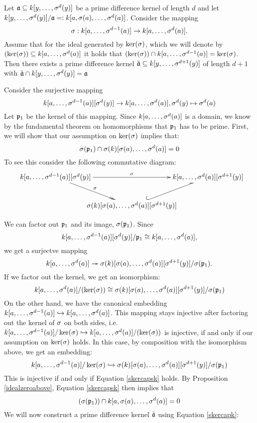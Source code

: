 
 
\begin{prop}
Let $\mathfrak{a} \subseteq k[y,\ldots,\sigma^d(y)]$ be a prime difference kernel of length $d$ and let $k[y,\ldots,\sigma^d(y)]/\mathfrak{a} =: k[a,\sigma(a),\ldots,\sigma^d(a)]$. Consider the mapping 
\[ \sigma: k[a,\ldots,\sigma^{d-1}(a)] \rightarrow k[a,\ldots,\sigma^d(a)]. \]
Assume that for the ideal generated by $\operatorname{ker}(\sigma)$, which we will denote by $(\operatorname{ker}(\sigma)) \subseteq k[a,\ldots,\sigma^d(a)]$ it holds that $(\operatorname{ker}(\sigma)) \cap k[a,\ldots,\sigma^{d-1}(a)] = \operatorname{ker}(\sigma)$. 
Then there exists a prime difference kernel $\tilde {\mathfrak{a}} \subseteq k[y,\ldots,\sigma^{d+1}(y)]$ of length $d+1$ with $\tilde {\mathfrak{a}} \cap k[y,\ldots,\sigma^d(y)] = \mathfrak{a}$
\begin{bew}
Consider the surjective mapping 
\[ k[a,\ldots,\sigma^{d-1}(a)][\sigma^d(y)] \rightarrow k[a,\ldots,\sigma^d(a)], \sigma^d(y) \mapsto \sigma^d(a) \]
Let $\mathfrak{p}_1$ be the kernel of this mapping. Since $k[a,\ldots,\sigma^d(a)]$ is a domain, we know by the fundamental theorem on homomorphisms that $\mathfrak{p}_1$ has to be prime. 
First, we will show that our assumption on $\operatorname{ker}(\sigma)$ implies that:
\begin{equation}\label{skercapsk} \sigma(\mathfrak{p}_1) \cap \sigma(k)[\sigma(a),\ldots,\sigma^d(a)] = 0 \end{equation}
To see this consider the following commutative diagram:
\[
\begin{xy}
\xymatrixcolsep{-1pc}
 \xymatrix{
      k[a,\ldots,\s^{d-1}(a)][\s^d(y)] \ar[rr]^\s \ar@{->>}[rd]^\s  &     &  k[a,\ldots,\s^d(a)][\s^{d+1}(y)]   \\
      &  \s(k)[\s(a),\ldots,\s^d(a)][\s^{d+1}(y)] \ar@^{(->}[ur] &  }
\end{xy}
\]

We can factor out $\mathfrak{p}_1$ and its image, $\sigma(\mathfrak{p}_1)$. Since $$k[a,\ldots,\sigma^{d-1}(a)][\sigma^d(y)] / \mathfrak{p}_1 \cong k[a,\ldots, \sigma^d(a)],$$
we get a surjectve mapping $$k[a,\ldots, \sigma^d(a)] \twoheadrightarrow \sigma(k)[\sigma(a),\ldots,\sigma^d(a)][\sigma^{d+1}(y)]/\sigma(\mathfrak{p}_1).$$
If we factor out the kernel, we get an isomorphism:
\[ k[a,\ldots, \sigma^d(a)]/(\operatorname{ker}(\sigma)) \cong \sigma(k)[\sigma(a),\ldots,\sigma^d(a)][\sigma^{d+1}(y)]/\sigma(\mathfrak{p}_1)\]
On the other hand, we have the canonical embedding $k[a,\ldots,\sigma^{d-1}(a)] \hookrightarrow k[a,\ldots,\sigma^{d}(a)]$.
This mapping stays injective after factoring out the kernel of $\sigma$ on both sides, 
i.e. $k[a,\ldots,\sigma^{d-1}(a)]/\operatorname{ker}(\sigma) \hookrightarrow k[a,\ldots,\sigma^{d}(a)]/(\operatorname{ker}(\sigma))$ is injective, if and only if our assumption on $\ker(\sigma)$ holds.
In this case, by composition with the isomorphism above, we get an embedding:
\[ k[a,\ldots,\sigma^{d-1}(a)]/\operatorname{ker}(\sigma) \hookrightarrow \sigma(k)[\sigma(a),\ldots,\sigma^d(a)][\sigma^{d+1}(y)]/\sigma(\mathfrak{p}_1) \]
This is injective if and only if Equation \ref{skercapsk} holds.
By Proposition \ref{idealzeroabove}, Equation \ref{skercapsk} then implies that
\begin{equation}\label{skercapk}
(\sigma(\mathfrak{p}_1)) \cap k[a,\sigma(a),\ldots,\sigma^d(a)]
 = 0
\end{equation}
We will now construct a prime difference kernel $\tilde {\mathfrak{a}}$ using Equation \ref{skercapk}:


\end{bew}
\end{prop}
